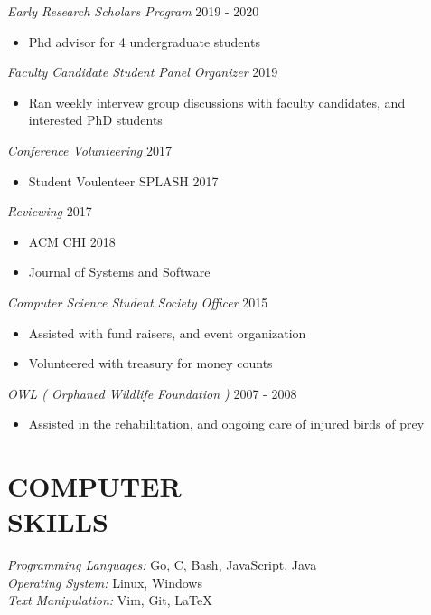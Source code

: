 \documentclass[line,margin]{res}
\begin{document}
\begin{resume}
{{\sl Early Research Scholars Program} {\hfill 2019 - 2020}
    \begin{itemize}
        \item Phd advisor for 4 undergraduate students
    \end{itemize}

{\sl Faculty Candidate Student Panel Organizer} {\hfill 2019}
    \begin{itemize}
        \item Ran weekly intervew group discussions with faculty
            candidates, and interested PhD students
     \end{itemize}

{\sl Conference Volunteering} \hfill 2017
    \begin{itemize}
        \item Student Voulenteer SPLASH 2017
    \end{itemize}

{\sl Reviewing} \hfill 2017
    \begin{itemize}
        \item ACM CHI 2018
        \item Journal of Systems and Software
    \end{itemize}

{\sl Computer Science Student Society Officer} \hfill 2015
    \begin{itemize}
        \item Assisted with fund raisers, and event organization
        \item Volunteered with treasury for money counts
    \end{itemize}

{\sl OWL ( Orphaned Wildlife Foundation )} {\hfill 2007 - 2008}
    \begin{itemize}
         \item Assisted in the rehabilitation, and ongoing care of injured birds of prey
    \end{itemize}
}
    

\section{COMPUTER \\ SKILLS} 
	{\sl Programming Languages:} Go, C, Bash, JavaScript, Java\\
	{\sl Operating System:} Linux, Windows\\
	{\sl Text Manipulation:} Vim, Git, \LaTeX \\


\end{resume}
\end{document}
